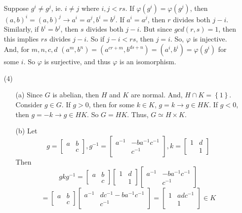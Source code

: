 \documentclass[12pt]{article}
\begin{document}
\begin{itemize}
Suppose $g^i \neq g^j$, ie. $i \neq j$ where $i, j < rs$. If $\varphi(g^i) = \varphi(g^j)$, then $(a, b)^i = (a, b)^j \rightarrow a^i = a^j, b^i = b^j$. If $a^i = a^j$, then $r$ divides both $j - i$. Similarly, if $b^i = b^j$, then $s$ divides both $j - i$. But since $gcd(r, s) = 1$, then this implies $rs$ divides $j - i$. So if $j - i < rs$, then $j = i$. So, $\varphi$ is injective. And, for $m, n, c, d$ $(a^m, b^n) = (a^{cr + m}, b^{ds + n}) = (a^i, b^i) = \varphi(g^i)$ for some $i$. So $\varphi$ is surjective, and thus $\varphi$ is an isomorphism.
\item[(4)]
\begin{itemize}
\item[(a)]
Since $G$ is abelian, then $H$ and $K$ are normal. And, $H \cap K = \left\lbrace 1 \right\rbrace$. Consider $g \in G$. If $g > 0$, then for some $k \in K$, $g = k \rightarrow g \in HK$. If $g < 0$, then $g = -k \rightarrow g \in HK$. So $G = HK$. Thus, $G \simeq H \times K$.
\item[(b)]
Let
$$g = \begin{bmatrix}
a & b \\
& c
\end{bmatrix}, g^{-1} = \begin{bmatrix}
a^{-1} & -ba^{-1}c^{-1} \\
& c^{-1}
\end{bmatrix}, k = \begin{bmatrix}
1 & d \\
& 1
\end{bmatrix}$$
Then
$$gkg^{-1} = \begin{bmatrix}
a & b \\
& c
\end{bmatrix}\begin{bmatrix}
1 & d \\
& 1
\end{bmatrix}\begin{bmatrix}
a^{-1} & -ba^{-1}c^{-1} \\
& c^{-1}
\end{bmatrix}$$
$$= \begin{bmatrix}
a & b \\
& c
\end{bmatrix}\begin{bmatrix}
a^{-1} & dc^{-1} - ba^{-1}c^{-1} \\
& c^{-1}
\end{bmatrix} = \begin{bmatrix}
1 & adc^{-1} \\
& 1
\end{bmatrix} \in K$$

\end{itemize}
\end{itemize}
\end{document}
